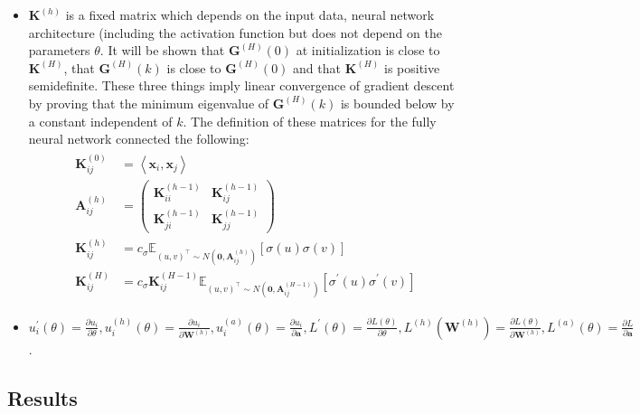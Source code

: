 \documentclass[11pt]{article}
\theoremstyle{plain}
\theoremstyle{definition}
\begin{document}
\begin{itemize}
\item $\mathbf{K}^{(h)}$ is a fixed matrix which depends on the input data, neural network architecture (including the activation function but does not depend on the parameters $\theta$. It will be shown that $\mathbf{G}^{(H)}(0)$ at initialization is close to $\mathbf{K}^{(H)}$, that $\mathbf{G}^{(H)}(k)$ is close to $\mathbf{G}^{(H)}(0)$ and that $\mathbf{K}^{(H)}$ is positive semidefinite. These three things imply linear convergence of gradient descent by proving that the minimum eigenvalue of $\mathbf{G}^{(H)}(k)$ is bounded below by a constant independent of $k$. The definition of these matrices for the fully neural network connected the following: 
 \begin{align} 
\begin{aligned} 
    \mathbf{K}_{i j}^{(0)} &=\left\langle\mathbf{x}_{i}, \mathbf{x}_{j}\right\rangle \\ \mathbf{A}_{i j}^{(h)} &=\left(\begin{array}{cc}{\mathbf{K}_{i i}^{(h-1)}} & {\mathbf{K}_{i j}^{(h-1)}} \\ {\mathbf{K}_{j i}^{(h-1)}} & {\mathbf{K}_{j j}^{(h-1)}}\end{array}\right) \\ \mathbf{K}_{i j}^{(h)} &=c_{\sigma} \mathbb{E}_{(u, v)^{\top} \sim N\left(\mathbf{0}, \mathbf{A}_{i j}^{(h)}\right)}[\sigma(u) \sigma(v)] \\ \mathbf{K}_{i j}^{(H)} &=c_{\sigma} \mathbf{K}_{i j}^{(H-1)} \mathbb{E}_{(u, v)^{\top} \sim N\left(\mathbf{0}, \mathbf{A}_{i j}^{(H-1)}\right)}\left[\sigma^{\prime}(u) \sigma^{\prime}(v)\right] 
\end{aligned}
\end{align}

\item  $u_{i}^{\prime}(\theta) = \frac{\partial u_{i}}{\partial \theta},  u_{i}^{(h)}(\theta) = \frac{\partial u_{i}}{\partial \mathbf{W}^{(h)}},  u_{i}^{(a)}(\theta) = \frac{\partial u_{i}}{\partial \mathbf{a}}, L^{\prime}(\theta)=\frac{\partial L(\theta)}{\partial \theta},  L^{(h)}(\mathbf{W}^{(h)})=\frac{\partial L(\theta)}{\partial \mathbf{W}^{(h)}},  L^{(a)}(\theta) = \frac{\partial L}{\partial \mathbf{a}}$.

\end{itemize}

\subsection*{Results}
\end{document}
